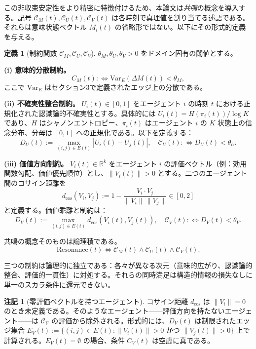 \documentclass[11pt,a4paper]{article}
\theoremstyle{definition}
\newtheorem{definition}{定義}[section]
\newtheorem{remark}{注記}[section]
\begin{document}
この非収束安定性をより精密に特徴付けるため、本論文は\textit{共鳴}の概念を導入する。記号 $\mathcal{C}_M(t), \mathcal{C}_U(t), \mathcal{C}_V(t)$ は各時刻で真理値を割り当てる述語である。それらは意味状態ベクトル $M_i(t)$ の省略形ではない。以下にその形式的定義を与える。

\begin{definition}[制約関数 $\mathcal{C}_M, \mathcal{C}_U, \mathcal{C}_V$]
$\theta_M, \theta_U, \theta_V > 0$ をドメイン固有の閾値とする。

\textbf{(i) 意味的分散制約。}
\[
C_M(t) :\Leftrightarrow \text{Var}_E(\Delta M(t)) < \theta_M,
\]
ここで $\text{Var}_E$ はセクション3で定義されたエッジ上の分散である。

\textbf{(ii) 不確実性整合制約。}
$U_i(t) \in [0,1]$ をエージェント $i$ の時刻 $t$ における正規化された認識論的不確実性とする。具体的には $U_i(t) = H(\pi_i(t)) / \log K$ であり、$H$ はシャノンエントロピー、$\pi_i(t)$ はエージェント $i$ の $K$ 状態上の信念分布、分母は $[0,1]$ への正規化である。以下を定義する：
\[
D_U(t) := \max_{(i,j) \in E(t)} |U_i(t) - U_j(t)|, \quad \mathcal{C}_U(t) :\Leftrightarrow D_U(t) < \theta_U.
\]

\textbf{(iii) 価値方向制約。}
$V_i(t) \in \mathbb{R}^k$ をエージェント $i$ の評価ベクトル（例：効用関数勾配、価値優先順位）とし、$\|V_i(t)\| > 0$ とする。二つのエージェント間のコサイン距離を
\[
d_{\cos}(V_i, V_j) := 1 - \frac{V_i \cdot V_j}{\|V_i\|\,\|V_j\|} \in [0, 2]
\]
と定義する。価値乖離と制約は：
\[
D_V(t) := \max_{(i,j) \in E(t)} d_{\cos}(V_i(t), V_j(t)), \quad \mathcal{C}_V(t) :\Leftrightarrow D_V(t) < \theta_V.
\]
\end{definition}

共鳴の概念そのものは論理積である。
\[
\mathrm{Resonance}(t)
\iff
\mathcal{C}_M(t)
\land
\mathcal{C}_U(t)
\land
\mathcal{C}_V(t).
\]

三つの制約は論理的に独立である：各々が異なる次元（意味的広がり、認識論的整合、評価的一貫性）に対処する。それらの同時満足は構造的情報の損失なしに単一のスカラ条件に還元できない。

\begin{remark}[零評価ベクトルを持つエージェント]
コサイン距離 $d_{\cos}$ は $\|V_i\| = 0$ のとき未定義である。そのようなエージェント——評価方向を持たないエージェント——は $\mathcal{C_V}$ の評価から除外される。形式的には、$D_V(t)$ は制限されたエッジ集合 $E_V(t) := \{(i,j) \in E(t) : \|V_i(t)\| > 0 \text{ かつ } \|V_j(t)\| > 0\}$ 上で計算される。$E_V(t) = \emptyset$ の場合、条件 $C_V(t)$ は空虚に真である。
\end{remark}
\end{document}
